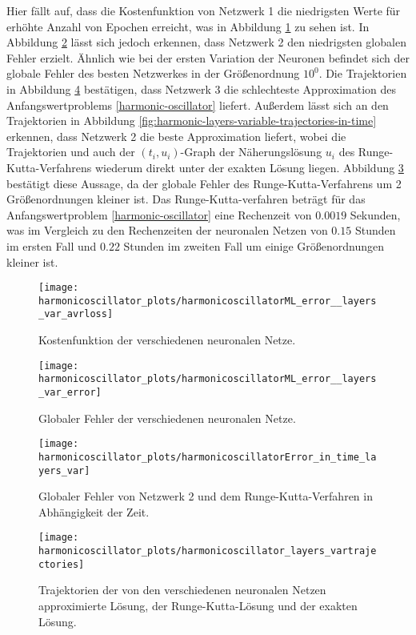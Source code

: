 Hier fällt auf, dass die Kostenfunktion von Netzwerk 1 die niedrigsten Werte für erhöhte Anzahl von Epochen erreicht,
was in Abbildung \ref{fig:harmonic-layers-variable-loss} zu sehen ist. In Abbildung
\ref{fig:harmonic-layers-variable-error} lässt sich jedoch erkennen, dass Netzwerk 2 den niedrigsten globalen Fehler
erzielt. Ähnlich wie bei der ersten Variation der
Neuronen befindet sich der globale Fehler des besten Netzwerkes in der Größenordnung $10^0$. Die Trajektorien in
Abbildung \ref{fig:harmonic-layers-variable-trajectories} bestätigen, dass Netzwerk 3 die schlechteste Approximation des
Anfangswertproblems \eqref{harmonic-oscillator} liefert. Außerdem lässt sich an den Trajektorien in Abbildung
\ref{fig:harmonic-layers-variable-trajectories-in-time} erkennen, dass Netzwerk 2 die beste Approximation liefert,
wobei die Trajektorien und auch der $(t_i,u_i)$-Graph der Näherungslösung $u_i$ des Runge-Kutta-Verfahrens wiederum
direkt unter der exakten Lösung liegen. Abbildung \ref{fig:harmonic-layers-variable-error-in-time} bestätigt diese
Aussage, da der globale Fehler des Runge-Kutta-Verfahrens um 2 Größenordnungen kleiner ist. Das Runge-Kutta-verfahren
beträgt für das Anfangswertproblem \eqref{harmonic-oscillator} eine Rechenzeit von $0.0019$ Sekunden, was im Vergleich
zu den Rechenzeiten der neuronalen Netzen von $0.15$ Stunden im ersten Fall und $0.22$ Stunden im zweiten Fall um einige
Größenordnungen kleiner ist.
\begin{figure}
       \centering
       \texttt{[image: harmonicoscillator\_plots/harmonicoscillatorML\_error\_\_layers\_var\_avrloss]}
       \caption{Kostenfunktion der verschiedenen neuronalen Netze.}
       \label{fig:harmonic-layers-variable-loss}
\end{figure}
\begin{figure}
       \centering
       \texttt{[image: harmonicoscillator\_plots/harmonicoscillatorML\_error\_\_layers\_var\_error]}
       \caption{Globaler Fehler der verschiedenen neuronalen Netze.}
       \label{fig:harmonic-layers-variable-error}
\end{figure}
\begin{figure}
       \centering
       \texttt{[image: harmonicoscillator\_plots/harmonicoscillatorError\_in\_time\_layers\_var]}
       \caption{Globaler Fehler von Netzwerk 2 und dem Runge-Kutta-Verfahren in Abhängigkeit der Zeit.}
       \label{fig:harmonic-layers-variable-error-in-time}
\end{figure}
\begin{figure}
       \centering
       \texttt{[image: harmonicoscillator\_plots/harmonicoscillator\_layers\_vartrajectories]}
       \caption{Trajektorien der von den verschiedenen neuronalen Netzen approximierte Lösung, der Runge-Kutta-Lösung
       und der exakten Lösung.}
       \label{fig:harmonic-layers-variable-trajectories}
\end{figure}
